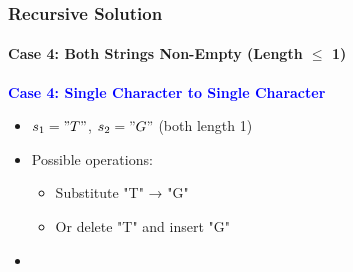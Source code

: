 \documentclass[10pt,aspectratio=43]{beamer}
\begin{document}
\begin{frame}
    \frametitle{Recursive Solution }
    \framesubtitle{Case 4: Both Strings Non-Empty (Length $\leq$ 1)}

    \textcolor{blue}{\textbf{Case 4: Single Character to Single Character}}
    \begin{itemize}
        \item $s_1 = "T"$, $s_2 = "G"$ (both length 1)
        \item Possible operations:
        \begin{itemize}
            \item Substitute "T" → "G"
            \item Or delete "T" and insert "G"
        \end{itemize}
        \item {}
    \end{itemize}

    \vspace{0.4cm}

\end{frame}
\end{document}
